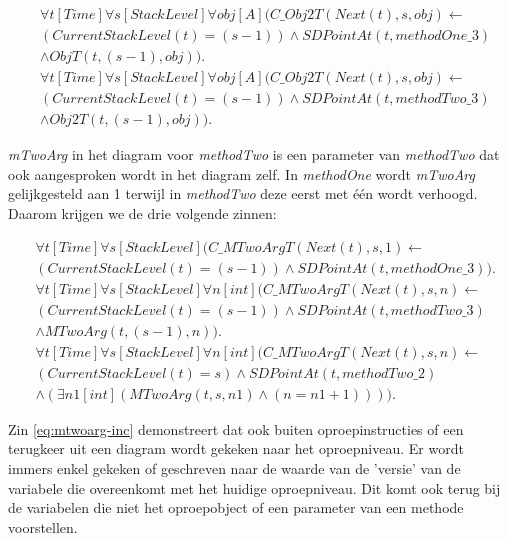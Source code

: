 \begin{align}
	\nonumber &\forall{t}[Time]\forall{s}[StackLevel]\forall{obj}[A](C\_Obj2T(Next(t), s, obj) \leftarrow
	\\ \nonumber &(CurrentStackLevel(t) = (s-1)) \land SDPointAt(t, methodOne\_3) \\ &\land ObjT(t, (s-1), obj)). \\
	\nonumber &\forall{t}[Time]\forall{s}[StackLevel]\forall{obj}[A](C\_Obj2T(Next(t), s, obj) \leftarrow
	\\ \nonumber &(CurrentStackLevel(t) = (s-1)) \land SDPointAt(t, methodTwo\_3) \\ &\land Obj2T(t, (s-1), obj)).
\end{align}

\textit{mTwoArg} in het diagram voor \textit{methodTwo} is een parameter van \textit{methodTwo} dat ook aangesproken wordt in het diagram zelf. In \textit{methodOne} wordt \textit{mTwoArg} gelijkgesteld aan 1 terwijl in \textit{methodTwo} deze eerst met \'e\'en wordt verhoogd. Daarom krijgen we de drie volgende zinnen:

\begin{align}
	\nonumber &\forall{t}[Time]\forall{s}[StackLevel](C\_MTwoArgT(Next(t), s, 1) \leftarrow \\ &(CurrentStackLevel(t) = (s-1)) \land SDPointAt(t, methodOne\_3)). \\
	\nonumber &\forall{t}[Time]\forall{s}[StackLevel]\forall{n}[int](C\_MTwoArgT(Next(t), s, n) \leftarrow \\ \nonumber &(CurrentStackLevel(t) = (s-1)) \land SDPointAt(t, methodTwo\_3) \\ &\land MTwoArg(t, (s-1), n)). \\
	\nonumber &\forall{t}[Time]\forall{s}[StackLevel]\forall{n}[int](C\_MTwoArgT(Next(t), s, n) \leftarrow \\ \nonumber &(CurrentStackLevel(t) = s) \land SDPointAt(t, methodTwo\_2) \\ &\land (\exists{n1}[int](MTwoArg(t, s, n1) \land (n = n1 + 1)))).\label{eq:mtwoarg-inc}
\end{align}

Zin \ref{eq:mtwoarg-inc} demonstreert dat ook buiten oproepinstructies of een terugkeer uit een diagram wordt gekeken naar het oproepniveau. Er wordt immers enkel gekeken of geschreven naar de waarde van de 'versie' van de variabele die overeenkomt met het huidige oproepniveau. Dit komt ook terug bij de variabelen die niet het oproepobject of een parameter van een methode voorstellen.

